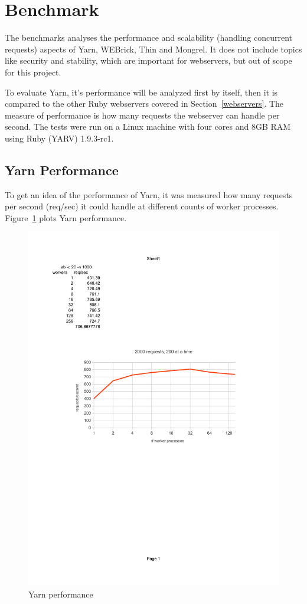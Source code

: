 \section{Benchmark}
\label{eval}
The benchmarks analyses the performance and scalability (handling
concurrent requests) aspects of Yarn, WEBrick, Thin and Mongrel. It does not
include topics like security and stability, which are important for
webservers, but out of scope for this project.

To evaluate Yarn, it's performance will be analyzed first by itself, then it
is compared to the other Ruby webservers covered in Section~\ref{webservers}.
The measure of performance is how many requests the webserver can handle per
second. The tests were run on a Linux machine with four cores and 8GB RAM
using Ruby (YARV) 1.9.3-rc1.

\subsection{Yarn Performance}
To get an idea of the performance of Yarn, it was measured how many requests
per second (req/sec) it could handle at different counts of worker processes.
Figure~\ref{optwork} plots Yarn performance.

\begin{figure}[htb]
  \centering
  \includegraphics[width=1.0\textwidth]{results/optimal_workers.pdf}
  \caption{Yarn performance}
  \label{optwork}
\end{figure}

